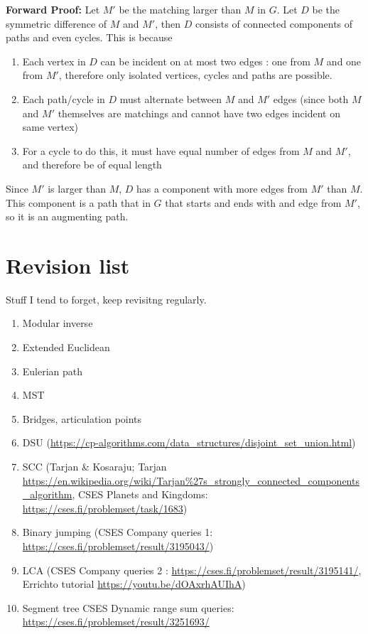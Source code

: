 \documentclass[titlepage, 12pt]{book}
\begin{document}
\textbf{Forward Proof:}
Let $M'$ be the matching larger than $M$ in $G$. Let $D$ be the symmetric
difference of $M$ and $M'$, then $D$ consists of connected components of paths
and even cycles. This is because

\begin{enumerate}
    \item Each vertex in $D$ can be incident on at most two edges : one from $M$
        and one from $M'$, therefore only isolated vertices, cycles and paths
        are possible.
    \item Each path/cycle in $D$ must alternate between $M$ and $M'$ edges
        (since both $M$ and $M'$ themselves are matchings and cannot have two
        edges incident on same vertex)
    \item For a cycle to do this, it must have equal number of edges from $M$
        and $M'$, and therefore be of equal length
\end{enumerate}
Since $M'$ is larger than $M$, $D$ has a component with more edges from $M'$
than $M$. This component is a path that in $G$ that starts and ends with and
edge from $M'$, so it is an augmenting path.

\chapter{Revision list}
Stuff I tend to forget, keep revisitng regularly.
\begin{enumerate}
  \item Modular inverse
  \item Extended Euclidean
  \item Eulerian path
  \item MST
  \item Bridges, articulation points
  \item DSU (\url{https://cp-algorithms.com/data_structures/disjoint_set_union.html})
  \item SCC (Tarjan \& Kosaraju; Tarjan
    \url{https://en.wikipedia.org/wiki/Tarjan%27s_strongly_connected_components_algorithm},
      CSES Planets and Kingdoms: \url{https://cses.fi/problemset/task/1683})
  \item Binary jumping (CSES Company queries 1: \url{https://cses.fi/problemset/result/3195043/})
  \item LCA (CSES Company queries 2 :
    \url{https://cses.fi/problemset/result/3195141/}, Errichto tutorial \url{https://youtu.be/dOAxrhAUIhA})
  \item Segment tree {CSES Dynamic range sum queries: \url{https://cses.fi/problemset/result/3251693/}}
\end{enumerate}
\end{document}
